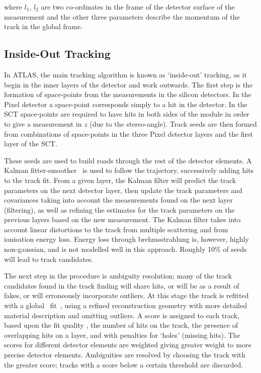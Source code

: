 where $l_{1}$, $l_{2}$ are two co-ordinates in the frame of the detector surface
of the measurement and the other three parameters describe the momentum of the track
in the global frame.

\subsection{Inside-Out Tracking}

In ATLAS, the main tracking algorithm is known as `inside-out' tracking, as it
begin in the inner layers of the detector and work outwards. The first step is
the formation of space-points from the measurements in the silicon detectors. In
the Pixel detector a space-point corresponds simply to a hit in the detector. In
the SCT space-points are required to have hits in both sides of the module in
order to give a measurement in $z$ (due to the stereo-angle). Track seeds are
then formed from combinations of space-points in the three Pixel detector layers
and the first layer of the SCT. 

These seeds are used to build roads through the
rest of the detector elements. A Kalman fitter-smoother~\cite{Fruhwirth:1987fm} is used to follow the
trajectory, successively adding hits to the track fit. From a given layer, the
Kalman filter will predict the track parameters on the next detector layer, then
update the track parameters and covariances taking into account the measurements
found on the next layer (filtering), as well as refining the estimates for the
track parameters on the previous layers based on the new measurement. The Kalman
filter takes into account linear distortions to the track from multiple
scattering and from ionisation energy loss. Energy loss through brehmsstrahlung
is, however, highly non-gaussian, and is not modelled well in this approach. Roughly
10\% of seeds will lead to track candidates.

The next step in the procedure is ambiguity resolution; many of the track
candidates found in the track finding will share hits, or will be as a result of
fakes, or will erroneously incorporate outliers. At this stage the track is
refitted with a global \chisquared\ fit~\cite{1742-6596-119-3-032013}, using a refined reconstruction geometry
with more detailed material description and omitting outliers. 
A score is assigned to each track, based upon the fit quality \chisquaredndof,
the number of hits on the track, the presence of overlapping hits on a layer,
and with
penalties for `holes' (missing hits). The scores for different detector elements
are weighted giving greater weight to more precise detector elements. Ambiguities
are resolved by choosing the track with the greater score; tracks with a score
below a certain threshold are discarded.

